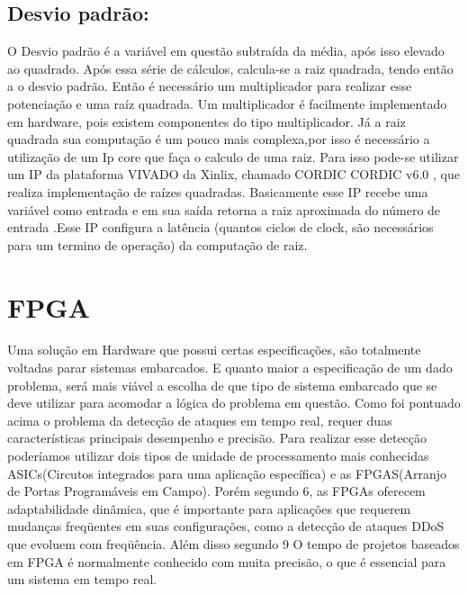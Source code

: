 	\subsection {Desvio padrão:} O Desvio padrão é a variável em questão subtraída da média, após isso elevado ao quadrado. Após essa série de cálculos, calcula-se a raiz quadrada, tendo então a o desvio padrão. Então é necessário um multiplicador para realizar esse potenciação e uma raíz quadrada. Um multiplicador é facilmente implementado em hardware, pois existem componentes do tipo multiplicador. Já a raiz quadrada sua computação é um pouco mais complexa,por isso é necessário a utilização de um Ip core que faça o calculo de uma raiz. Para isso pode-se utilizar um  IP da plataforma VIVADO da Xinlix, chamado CORDIC {CORDIC v6.0} , que realiza  implementação de raízes quadradas. Basicamente esse IP recebe uma variável como entrada e em sua saída retorna a raiz aproximada do número de entrada .Esse IP configura a latência (quantos ciclos de clock, são necessários para um termino de operação) da computação  de raiz.
										
\section{FPGA}
Uma solução em Hardware que possui certas especificações, são totalmente voltadas parar sistemas embarcados. E quanto maior a especificação de um dado problema, será mais viável a escolha de que tipo de sistema embarcado que se deve utilizar para acomodar a lógica do problema em questão. Como foi pontuado acima o problema da detecção de ataques em tempo real, requer duas características principais desempenho e precisão. Para realizar esse detecção poderíamos utilizar dois tipos de unidade de processamento mais conhecidas ASICs(Circutos integrados para uma aplicação específica) e as FPGAS(Arranjo de Portas Programáveis em Campo). Porém segundo {6}, as FPGAs oferecem adaptabilidade dinâmica, que é importante para aplicações que requerem mudanças freqüentes em suas configurações, como a detecção de ataques DDoS que evoluem com freqüência. Além disso segundo {9} O tempo de projetos baseados em FPGA é normalmente conhecido com muita precisão, o que é essencial para um sistema em tempo real.

